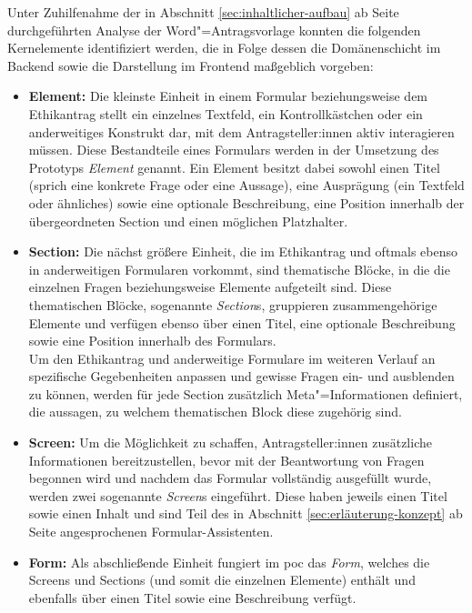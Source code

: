 \documentclass[a4paper,12pt,twoside,numbers=noendperiod]{scrreprt}
\begin{document}
Unter Zuhilfenahme der in Abschnitt \ref{sec:inhaltlicher-aufbau} ab Seite \pageref{sec:inhaltlicher-aufbau} durchgeführten Analyse der Word"=Antragsvorlage konnten die folgenden Kernelemente identifiziert werden, die in Folge dessen die Domänenschicht im Backend sowie die Darstellung im Frontend maßgeblich vorgeben:
\begin{itemize}
    \item \textbf{Element:} Die kleinste Einheit in einem Formular beziehungsweise dem Ethikantrag stellt ein einzelnes Textfeld, ein Kontrollkästchen oder ein anderweitiges Konstrukt dar, mit dem Antragsteller:innen aktiv interagieren müssen. Diese Bestandteile eines Formulars werden in der Umsetzung des Prototyps \textit{Element} genannt. Ein Element besitzt dabei sowohl einen Titel (sprich eine konkrete Frage oder eine Aussage), eine Ausprägung (ein Textfeld oder ähnliches) sowie eine optionale Beschreibung, eine Position innerhalb der übergeordneten Section und einen möglichen Platzhalter.
    \item \textbf{Section:} Die nächst größere Einheit, die im Ethikantrag und oftmals ebenso in anderweitigen Formularen vorkommt, sind thematische Blöcke, in die die einzelnen Fragen beziehungsweise Elemente aufgeteilt sind. Diese thematischen Blöcke, sogenannte \textit{Section}s, gruppieren zusammengehörige Elemente und verfügen ebenso über einen Titel, eine optionale Beschreibung sowie eine Position innerhalb des Formulars.\\
    Um den Ethikantrag und anderweitige Formulare im weiteren Verlauf an spezifische Gegebenheiten anpassen und gewisse Fragen ein- und ausblenden zu können, werden für jede Section zusätzlich Meta"=Informationen definiert, die aussagen, zu welchem thematischen Block diese zugehörig sind.
    \item \textbf{Screen:} Um die Möglichkeit zu schaffen, Antragsteller:innen zusätzliche Informationen bereitzustellen, bevor mit der Beantwortung von Fragen begonnen wird und nachdem das Formular vollständig ausgefüllt wurde, werden zwei sogenannte \textit{Screen}s eingeführt. Diese haben jeweils einen Titel sowie einen Inhalt und sind Teil des in Abschnitt \ref{sec:erläuterung-konzept} ab Seite \pageref{sec:erläuterung-konzept} angesprochenen Formular-Assistenten.
    \item \textbf{Form:} Als abschließende Einheit fungiert im \ac{poc} das \textit{Form}, welches die Screens und Sections (und somit die einzelnen Elemente) enthält und ebenfalls über einen Titel sowie eine Beschreibung verfügt.
\end{itemize}
\end{document}
